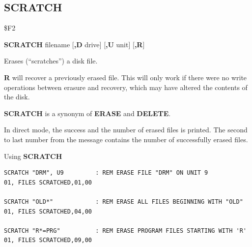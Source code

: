 \subsection{SCRATCH}
\begin{description}[leftmargin=2cm,style=nextline]
\item [Token:]    \$F2

\item [Format:]   {\bf SCRATCH} filename [{\bf,D} drive] [{\bf,U} unit] [{\bf,R}]

\item [Usage:]    Erases (``scratches'') a disk file.

                  \filenamedefinition

                  \drivedefinition

                  \unitdefinition

                  {\bf R} will recover a previously erased file. This will only work if there were no write operations between erasure and recovery, which may have altered the contents of the disk.

\item [Remarks:]  {\bf SCRATCH} is a synonym of {\bf ERASE} and {\bf DELETE}.

                  In direct mode, the success and the number of erased files is printed. The second to last number from the message contains the number of successfully erased files.

\item [Examples:] Using {\bf SCRATCH}

\begin{tcolorbox}[colback=black,coltext=white]
\verbatimfont{\codefont}
\begin{verbatim}
SCRATCH "DRM", U9         : REM ERASE FILE "DRM" ON UNIT 9
01, FILES SCRATCHED,01,00

SCRATCH "OLD*"            : REM ERASE ALL FILES BEGINNING WITH "OLD"
01, FILES SCRATCHED,04,00

SCRATCH "R*=PRG"          : REM ERASE PROGRAM FILES STARTING WITH 'R'
01, FILES SCRATCHED,09,00
\end{verbatim}
\end{tcolorbox}
\end{description}


\newpage
